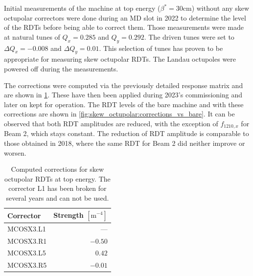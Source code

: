 Initial measurements of the machine at top energy ($\beta^*=30$cm) without any skew octupolar
correctors were done during an MD slot in 2022 to determine the level of the RDTs before being able
to correct them. Those measurements were made at natural tunes of $Q_x = 0.285$ and $Q_y = 0.292$.
The driven tunes were set to $\Delta Q_x = -0.008$ and $\Delta Q_y = 0.01$. This selection of tunes
has proven to be appropriate for measuring skew octupolar RDTs. The Landau octupoles were powered
off during the measurements. 

The corrections were computed via the previously detailed response matrix and are shown in
\cref{tab:skew_octupolar:correction_strengths}. These have then been applied during 2023's
commissioning and later on kept for operation. The RDT levels of the bare machine and with these
corrections are shown in \cref{fig:skew_octupolar:corrections_vs_bare}. It can be observed that both
RDT amplitudes are reduced, with the exception of $f_{1210,x}$ for Beam 2, which stays constant.
The reduction of RDT amplitude is comparable to those obtained in 2018, where the same RDT for Beam
2 did neither improve or worsen.


\begin{table}[!htb]
    \centering
    \begin{tabular}{lr}
      \toprule
      Corrector    &    Strength $[\text{m}^{-4}]$ \\
      \midrule
      MCOSX3.L1    &                —  \\
      MCOSX3.R1    &           $-0.50$ \\
      MCOSX3.L5    &           $ 0.42$ \\
      MCOSX3.R5    &           $-0.01$ \\
      \bottomrule
    \end{tabular}
    \caption{Computed corrections for skew octupolar RDTs at top energy. The corrector L1 has been 
    broken for several years and can not be used.}
    \label{tab:skew_octupolar:correction_strengths}
\end{table}
 
